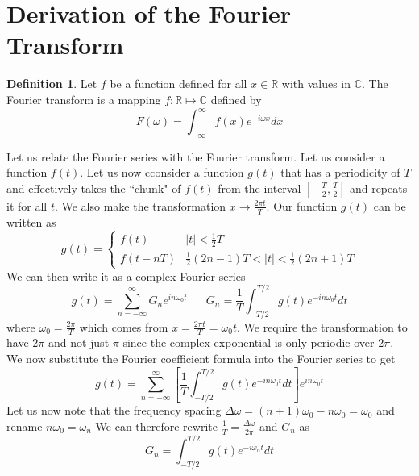 \documentclass{report}
\theoremstyle{definition}
\newtheorem{definition}[theorem]{Definition}
\theoremstyle{remark}
\newcommand{\R}{\mathbb{R}}
\newcommand{\twen}{\hspace{20pt}}
\begin{document}
\section{Derivation of the Fourier Transform}
\begin{definition}
    Let $f$ be a function defined for all $x\in \R$ with values in $\mathbb{C}$. The Fourier transform is a mapping $f:\R\mapsto \mathbb{C}$ defined by 
    \begin{equation*}
        F(\omega) = \int^\infty_{-\infty} f(x)e^{-i\omega x}dx
    \end{equation*}
\end{definition}
Let us relate the Fourier series with the Fourier transform. Let us consider a function $f(t)$. Let us now cconsider a function $g(t)$ that has a periodicity of $T$ and effectively takes the ``chunk" of $f(t)$ from the interval $\left[-\frac{T}{2},\frac{T}{2}\right]$ and repeats it for all $t$. We also make the transformation $x\rightarrow\frac{2\pi t}{T}$. Our function $g(t)$ can be written as 
\begin{equation*}
    g(t) =\begin{cases}
        f(t) &|t|<\tfrac{1}{2}T \\
        f(t-nT) & \tfrac{1}{2}(2n-1)T < |t| < \tfrac{1}{2}(2n+1)T
    \end{cases}
\end{equation*}
We can then write it as a complex Fourier series 
\begin{equation*}
    g(t) = \sum^\infty_{n=-\infty} G_ne^{in\omega_0t} \twen G_n = \frac{1}{T} \int^{T/2}_{-T/2}g(t)e^{-in\omega_0 t}dt
\end{equation*}
where $\omega_0 = \frac{2\pi}{T}$ which comes from $x=\frac{2\pi t}{T}=\omega_0t$. We require the transformation to have $2\pi$ and not just $\pi$ since the complex exponential is only periodic over $2\pi$. We now substitute the Fourier coefficient formula into the Fourier series to get 
\begin{equation*}
    g(t) = \sum^\infty_{n=-\infty} \left[ \frac{1}{T}\int^{T/2}_{-T/2}g(t)e^{-in\omega_0t}dt\right]e^{in\omega_0 t}
\end{equation*}
Let us now note that the frequency spacing $\Delta \omega = (n+1)\omega_0-n\omega_0=\omega_0$ and rename $n\omega_0=\omega_n$ We can therefore rewrite $\frac{1}{T} =\frac{\Delta \omega}{2\pi}$ and $G_n$ as 
\begin{equation*}
    G_n = \int^{T/2}_{-T/2}g(t)e^{-i\omega_nt}dt
\end{equation*}
\end{document}
